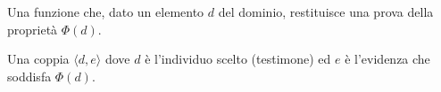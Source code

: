 \begin{description}[leftmargin=3.5em, style=nextline]
    \item[$\forall x \Phi(x)$] Una funzione che, dato un elemento $d$ del dominio, restituisce una prova della proprietà $\Phi(d)$.
    \item[$\exists x \Phi(x)$] Una coppia $\langle d, e \rangle$ dove $d$ è l'individuo scelto (testimone) ed $e$ è l'evidenza che soddisfa $\Phi(d)$.
\end{description}